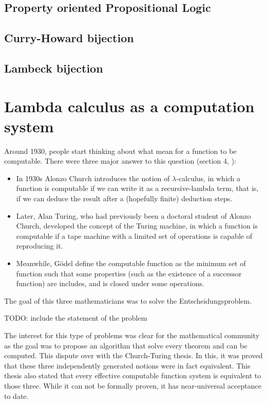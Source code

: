 \subsection{Property oriented Propositional Logic}
\subsection{Curry-Howard bijection}
\subsection{Lambeck bijection}


\newpage
\section{Lambda calculus as a computation system}
Around 1930, people start thinking about what mean for a function to be computable. There were three major answer to this question (section 4, \cite{cardone2006history}):
\begin{itemize}
\item In 1930s Alonzo Church introduces the notion of $\lambda$-calculus, in which a function is computable if we can write it as a recursive-lambda term, that is, if we can deduce the result after a (hopefully finite) deduction steps.
\item Later, Alan Turing, who had previously been a doctoral student of Alonzo Church, developed the concept of the Turing machine, in which a function is computable if a tape machine with a limited set of operations is capable of reproducing it.
\item Meanwhile, Gödel define the computable function as the minimum set of function such that some properties (such as the existence of a successor function) are includes, and is closed under some operations. 
\end{itemize}

The goal of this three mathematicians was to solve the Entscheidungsproblem\cite{hilbert1999principles}.

{\color{red} TODO: include the statement of the problem\\}

The interest for this type of problems was clear for the mathematical community as the goal was to propose an algorithm that solve every theorem and can be computed. This dispute over with the Church-Turing thesis. In this, it was proved that these three independently generated notions were in fact equivalent. This thesis also stated that every effective computable function system is equivalent to those three. While it can not be formally proven, it has near-universal acceptance to date.\\

